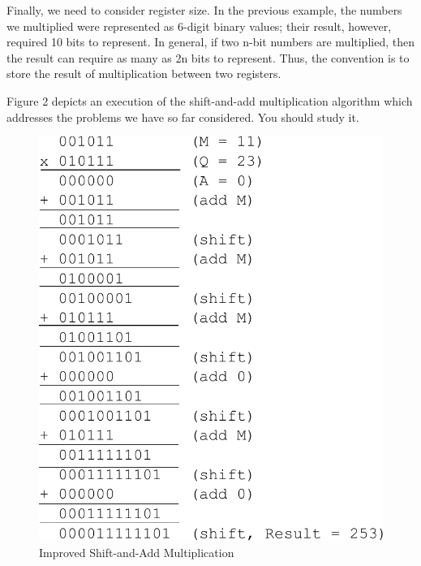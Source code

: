 \documentclass{article}
\begin{document}
Finally, we need to consider register size.
In the previous example, the numbers we multiplied were represented as 6-digit binary values; their result, however, required 10 bits to represent.
In general, if two n-bit numbers are multiplied, then the result can require as many as 2n bits to represent.
Thus, the convention is to store the result of multiplication between two registers.

Figure 2 depicts an execution of the shift-and-add multiplication algorithm which addresses the problems we have so far considered.
You should study it.

\begin{figure}[h]
\centering
\includegraphics[scale=0.7]{isaam2.pdf}
\caption{Improved Shift-and-Add Multiplication}
\end{figure}

\pagebreak
\end{document}
